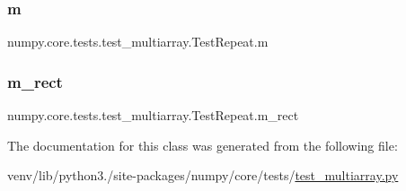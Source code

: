 \subsubsection{\texorpdfstring{m}{m}}
{\footnotesize\ttfamily numpy.\+core.\+tests.\+test\+\_\+multiarray.\+Test\+Repeat.\+m}

\mbox{\label{classnumpy_1_1core_1_1tests_1_1test__multiarray_1_1TestRepeat_ae42ab208d0d4ff18bee8e8723d081503}} 
\subsubsection{\texorpdfstring{m\+\_\+rect}{m\_rect}}
{\footnotesize\ttfamily numpy.\+core.\+tests.\+test\+\_\+multiarray.\+Test\+Repeat.\+m\+\_\+rect}



The documentation for this class was generated from the following file\+:\begin{DoxyCompactItemize}
\item 
venv/lib/python3./site-\/packages/numpy/core/tests/\hyperlink{core_2tests_2test__multiarray_8py}{test\+\_\+multiarray.\+py}\end{DoxyCompactItemize}
